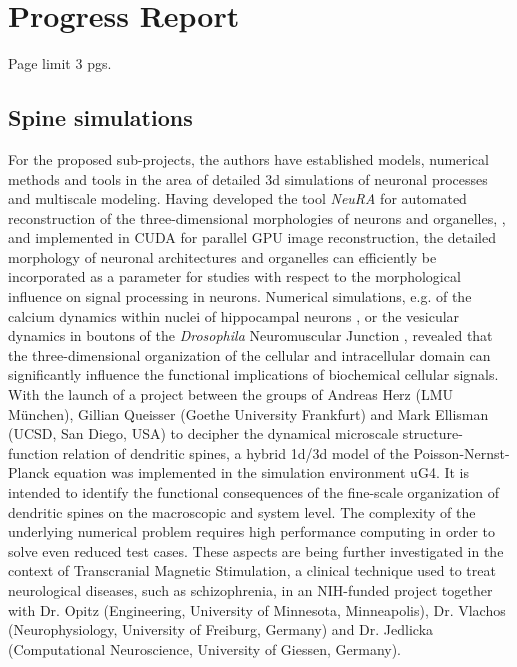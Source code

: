 \documentclass[a4paper, 11pt, notitlepage]{nsf}
\newcommand{\ug}{uG4\xspace}
\begin{document}
\section*{Progress Report}
Page limit 3 pgs.
%

\subsection{Spine simulations}

For the proposed sub-projects, the authors have established models, numerical methods and tools in the area of detailed 3d simulations of neuronal processes and multiscale modeling. Having developed the tool \emph{NeuRA} for automated reconstruction of the three-dimensional morphologies of neurons and organelles, \cite{Jungblut2011}, and implemented in CUDA for parallel GPU image reconstruction, the detailed morphology of neuronal architectures and organelles can efficiently be incorporated as a parameter for studies with respect to the morphological influence on signal processing in neurons. Numerical simulations, e.g. of the calcium dynamics within nuclei of hippocampal neurons  \cite{Queisser2008, Wittmann2009}, or the vesicular dynamics in boutons of the \emph{Drosophila} Neuromuscular Junction \cite{Knodel2014}, revealed that the three-dimensional organization of the cellular and intracellular domain can significantly influence the functional implications of biochemical cellular signals. 
With the launch of a project between the groups of Andreas Herz (LMU M\"unchen), Gillian Queisser (Goethe University Frankfurt) and Mark Ellisman (UCSD, San Diego, USA) to decipher the dynamical microscale structure-function relation of dendritic spines, a hybrid 1d/3d model of the Poisson-Nernst-Planck equation was implemented in the simulation environment \ug \cite{Vogel2013, Heppner13}. It is intended to identify the functional consequences of the fine-scale organization of dendritic spines on the macroscopic and system level. The complexity of the underlying numerical problem requires high performance computing in order to solve even reduced test cases. 
These aspects are being further investigated in the context of Transcranial Magnetic Stimulation, a clinical technique used to treat neurological diseases, such as schizophrenia, in an NIH-funded project together with Dr. Opitz (Engineering, University of Minnesota, Minneapolis), Dr. Vlachos (Neurophysiology, University of Freiburg, Germany) and Dr. Jedlicka (Computational Neuroscience, University of Giessen, Germany). 
\end{document}
